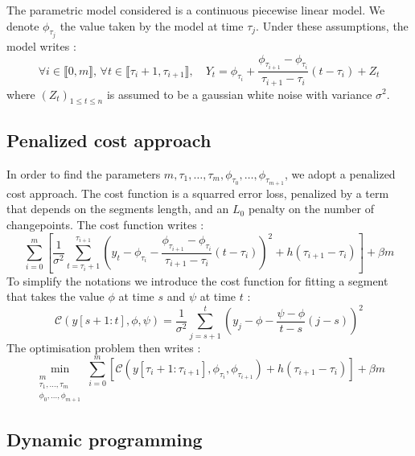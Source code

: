 \documentclass[11pt]{article}
\begin{document}
The parametric model considered is a continuous piecewise linear model. We denote $\phi_{\tau_j}$ the value taken by the model at time $\tau_j$. Under these assumptions, the model writes :
\begin{equation}
    \forall i\in \llbracket0,m\rrbracket,\,\forall t \in \llbracket\tau_i+1,\tau_{i+1}\rrbracket, \quad Y_t=\phi_{\tau_i}+\frac{\phi_{\tau_{i+1}}-\phi_{\tau_i}}{\tau_{i+1}-\tau_i}(t-\tau_i)+Z_t
\end{equation}
where $(Z_t)_{1\leq t\leq n}$ is assumed to be a gaussian white noise with variance $\sigma^2$.

\subsection{Penalized cost approach}

In order to find the parameters $m, \tau_1,\dots,\tau_{m}, \phi_{\tau_0},\dots, \phi_{\tau_{m+1}}$, we adopt a penalized cost approach. The cost function is a squarred error loss, penalized by a term that depends on the segments length, and an $L_0$ penalty on the number of changepoints. The cost function writes :
\begin{equation}
    \sum_{i=0}^m \left[\frac{1}{\sigma^2}\sum_{t=\tau_i+1}^{\tau_{i+1}} \left(y_t-\phi_{\tau_i}-\frac{\phi_{\tau_{i+1}}-\phi_{\tau_i}}{\tau_{i+1}-\tau_i}(t-\tau_i)\right)^2 + h(\tau_{i+1}-\tau_i)\right]+\beta m
\end{equation}
To simplify the notations we introduce the cost function for fitting a segment that takes the value $\phi$ at time $s$ and $\psi$ at time $t$ :
\begin{equation}
    \mathcal{C}(y[s+1:t],\phi,\psi) = \frac{1}{\sigma^2}\sum_{j=s+1}^t \left(y_j-\phi-\frac{\psi-\phi}{t-s}(j-s)\right)^2
\end{equation}
The optimisation problem then writes :
\begin{equation}
    \label{eq:problem}
    \min_{\substack{m\\\tau_1,\dots,\tau_m\\ \phi_0,\dots,\phi_{m+1}}} \sum_{i=0}^m \left[\mathcal{C}(y[\tau_i+1:\tau_{i+1}],\phi_{\tau_i},\phi_{\tau_{i+1}}) + h(\tau_{i+1}-\tau_i)\right] + \beta m
\end{equation}

\subsection{Dynamic programming}
\end{document}
